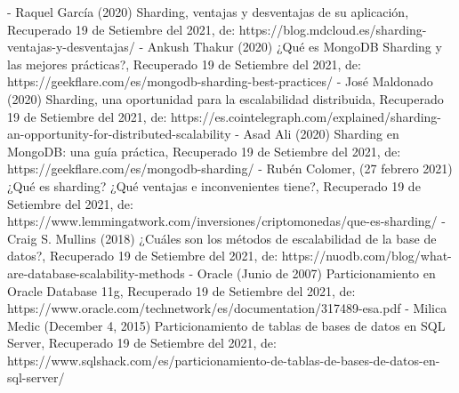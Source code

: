 \documentclass[twoside,twocolumn]{article}
\begin{document}
\begin{thebibliography}{XXX0000}
	\bibitem - Raquel García (2020) Sharding, ventajas y desventajas de su aplicación, Recuperado 19 de Setiembre del 2021, de: https://blog.mdcloud.es/sharding-ventajas-y-desventajas/ 
	\bibitem - Ankush Thakur (2020) ¿Qué es MongoDB Sharding y las mejores prácticas?, Recuperado 19 de Setiembre del 2021, de: https://geekflare.com/es/mongodb-sharding-best-practices/
	\bibitem - José Maldonado (2020) Sharding, una oportunidad para la escalabilidad distribuida, Recuperado 19 de Setiembre del 2021, de: https://es.cointelegraph.com/explained/sharding-an-opportunity-for-distributed-scalability 
	\bibitem - Asad Ali (2020) Sharding en MongoDB: una guía práctica, Recuperado 19 de Setiembre del 2021, de: https://geekflare.com/es/mongodb-sharding/
	\bibitem - Rubén Colomer, (27 febrero 2021) ¿Qué es sharding? ¿Qué ventajas e inconvenientes tiene?, Recuperado 19 de Setiembre del 2021, de: https://www.lemmingatwork.com/inversiones/criptomonedas/que-es-sharding/  
	\bibitem - Craig S. Mullins (2018) ¿Cuáles son los métodos de escalabilidad de la base de datos?, Recuperado 19 de Setiembre del 2021, de: https://nuodb.com/blog/what-are-database-scalability-methods 
	\bibitem - Oracle (Junio de 2007) Particionamiento en Oracle Database 11g, Recuperado 19 de Setiembre del 2021, de: https://www.oracle.com/technetwork/es/documentation/317489-esa.pdf  
	\bibitem - Milica Medic (December 4, 2015) Particionamiento de tablas de bases de datos en SQL Server, Recuperado 19 de Setiembre del 2021, de: https://www.sqlshack.com/es/particionamiento-de-tablas-de-bases-de-datos-en-sql-server/ 
	\end{thebibliography}

\end{document}
